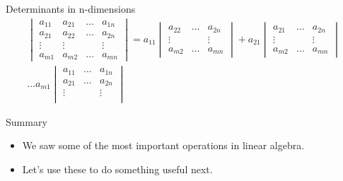 \documentclass[notes]{beamer}
\begin{document}
    \begin{frame}{Determinants in n-dimensions}
      \begin{align*}
      \begin{vmatrix}
        a_{11} & a_{21} & \dots & a_{1n} \\
        a_{21} & a_{22} & \dots & a_{2n} \\
        \vdots & \vdots &       & \vdots \\
        a_{m1} & a_{m2} & \dots & a_{mn}
      \end{vmatrix}
    = a_{11} \begin{vmatrix}
      a_{22} & \dots & a_{2n} \\
      \vdots &        & \vdots \\
      a_{m2} & \dots & a_{mn}
    \end{vmatrix}
    + a_{21} 
    \begin{vmatrix}
      a_{21} & \dots & a_{2n} \\
      \vdots &        & \vdots \\
      a_{m2} & \dots & a_{mn}
    \end{vmatrix}
    \\
    \dots 
     a_{m1}
    \begin{vmatrix} 
      a_{11} & \dots & a_{1n} \\
      a_{21} & \dots & a_{2n} \\
      \vdots &        & \vdots \\
    \end{vmatrix}
    \end{align*}
    \end{frame}

    \begin{frame}{Summary}
      \begin{itemize}
        \item We saw some of the most important operations in linear algebra.
        \item Let's use these to do something useful next.
      \end{itemize}
    \end{frame}
\end{document}

